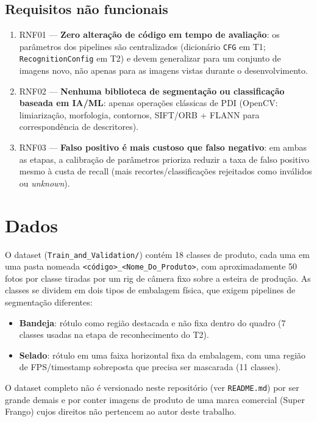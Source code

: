 \documentclass[a4paper,11pt]{article}
\begin{document}
\subsection{Requisitos não funcionais}

\begin{enumerate}[nosep]
  \item RNF01 --- \textbf{Zero alteração de código em tempo de avaliação}: os parâmetros dos
        pipelines são centralizados (dicionário \texttt{CFG} em T1; \texttt{RecognitionConfig}
        em T2) e devem generalizar para um conjunto de imagens novo, não apenas para as imagens
        vistas durante o desenvolvimento.
  \item RNF02 --- \textbf{Nenhuma biblioteca de segmentação ou classificação baseada em IA/ML}:
        apenas operações clássicas de PDI (OpenCV: limiarização, morfologia, contornos,
        SIFT/ORB + FLANN para correspondência de descritores).
  \item RNF03 --- \textbf{Falso positivo é mais custoso que falso negativo}: em ambas as etapas,
        a calibração de parâmetros prioriza reduzir a taxa de falso positivo mesmo à custa de
        recall (mais recortes/classificações rejeitados como inválidos ou \emph{unknown}).
\end{enumerate}

\section{Dados}

O dataset (\texttt{Train\_and\_Validation/}) contém 18 classes de produto, cada uma em uma pasta
nomeada \texttt{<código>\_<Nome\_Do\_Produto>}, com aproximadamente 50 fotos por classe tiradas
por um rig de câmera fixo sobre a esteira de produção. As classes se dividem em dois tipos de
embalagem física, que exigem pipelines de segmentação diferentes:

\begin{itemize}[nosep]
  \item \textbf{Bandeja}: rótulo como região destacada e não fixa dentro do quadro (7 classes
        usadas na etapa de reconhecimento do T2).
  \item \textbf{Selado}: rótulo em uma faixa horizontal fixa da embalagem, com uma região de
        FPS/timestamp sobreposta que precisa ser mascarada (11 classes).
  \end{itemize}

O dataset completo não é versionado neste repositório (ver \texttt{README.md}) por ser grande
demais e por conter imagens de produto de uma marca comercial (Super Frango) cujos direitos não
pertencem ao autor deste trabalho.
\end{document}
